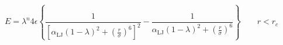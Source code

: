 


\[
E = \lambda^n 4 \epsilon
\left\{
  \frac{1}{ \left[ \alpha_{\mathrm{LJ}} (1-\lambda)^2 +
    \left( \displaystyle\frac{r}{\sigma} \right)^6 \right]^2 } -
  \frac{1}{ \alpha_{\mathrm{LJ}} (1-\lambda)^2 +
    \left( \displaystyle\frac{r}{\sigma} \right)^6 }
\right\} \qquad r < r_c
 \]



